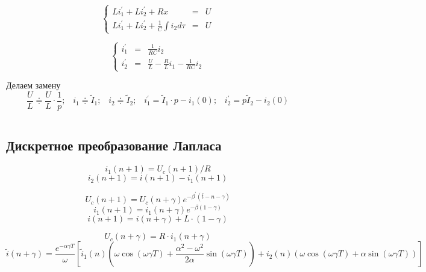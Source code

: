 \documentclass[a4paper,12pt]{article}
\begin{document}
$$
\left\{
\begin{array}{lcl}
	Li_1^\prime + L i_2^\prime + Rx &=& U\\[1.5mm]
	Li_1^\prime + L i_2^\prime + \frac{1}{C}\int i_2 d\tau &=& U
\end{array}
\right.
$$

$$
\left\{
\begin{array}{lcl}
	i_1^\prime &=& \frac{1}{RC} i_2\\[1.5mm]
	i_2^\prime &=& \frac{U}{L} - \frac{R}{L} i_1 - \frac{1}{RC} i_2
\end{array}
\right.
$$

Делаем замену
$$
\frac{U}{L} \doteqdot \frac{U}{L} \cdot \frac{1}{p};\; \; \; i_1 \doteqdot \tilde{I}_1 ;\; \; \; i_2 \doteqdot \tilde{I}_2; \; \; \;
i_1^\prime = \tilde{I}_1\cdot p - i_1(0); \; \; \;  i_2^\prime = p \tilde{I}_2 - i_2(0)
$$

$$
$$

\subsection{Дискретное преобразование Лапласа}

$$
i_1(n+1) = U_c(n+1)/R
$$
$$
i_2(n+1) = i(n+1) - i_1(n+1)
$$

$$
U_c(n+1) = U_c(n+\gamma) e^{-\beta^\prime (\bar{t} - n - \gamma)} 
$$
$$
i_1(n+1) = i_1(n+\gamma) e^{-\beta (1-\gamma)}
$$
$$
i(n+1) = i(n+\gamma) + L\cdot (1-\gamma)
$$

$$
U_c(n+\gamma) = R\cdot i_1(n+\gamma)
$$
$$
\tilde{i}(n+\gamma) = \frac{e^{-\alpha\gamma T}}{\omega} 
\left[
\tilde{i}_1(n)\left(\omega\cos(\omega\gamma T) + \frac{\alpha^2 - \omega^2}{2\alpha}\sin(\omega\gamma T) \right)
+ i_2(n)\left(\omega\cos(\omega\gamma T)  + \alpha\sin(\omega\gamma T)\right)
\right]
$$
\end{document}
